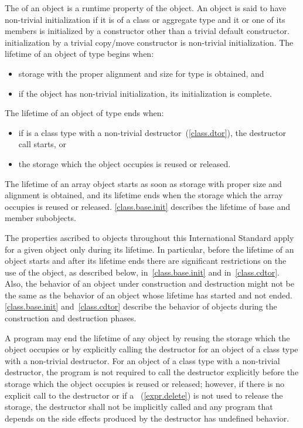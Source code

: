 \pnum
{}%
The  of an object is a runtime property of the
object.
An object is said to have non-trivial initialization if it is of a class or
aggregate type and it or one of its members is initialized by a constructor
other than a trivial default constructor. \enternote initialization by a
trivial copy/move constructor is non-trivial initialization. \exitnote
The lifetime of an object of type  begins when:

\begin{itemize}
\item storage with the proper alignment and size for type  is
obtained, and

\item if the object has non-trivial initialization, its initialization is complete.
\end{itemize}

The lifetime of an object of type  ends when:

\begin{itemize}
\item if  is a class type with a non-trivial
destructor~(\ref{class.dtor}), the destructor call starts, or

\item the storage which the object occupies is reused or released.
\end{itemize}

\pnum
\enternote The lifetime of an array object starts as soon as storage with proper size and
alignment is obtained, and its lifetime ends when the storage which the
array occupies is reused or released. \ref{class.base.init}
describes the lifetime of base and member subobjects. \exitnote

\pnum
The properties ascribed to objects throughout this International
Standard apply for a given object only during its lifetime. \enternote
In particular, before the lifetime of an object starts and after its
lifetime ends there are significant restrictions on the use of the
object, as described below, in~\ref{class.base.init} and
in~\ref{class.cdtor}. Also, the behavior of an object under construction
and destruction might not be the same as the behavior of an object whose
lifetime has started and not ended. \ref{class.base.init}
and~\ref{class.cdtor} describe the behavior of objects during the
construction and destruction phases. \exitnote

\pnum
A program may end the lifetime of any object by reusing the storage
which the object occupies or by explicitly calling the destructor for an
object of a class type with a non-trivial destructor. For an object of a
class type with a non-trivial destructor, the program is not required to
call the destructor explicitly before the storage which the object
occupies is reused or released; however, if there is no explicit call to
the destructor or if a ~(\ref{expr.delete})
is not used to release the storage, the destructor shall not be
implicitly called and any program that depends on the side effects
produced by the destructor has undefined behavior.

